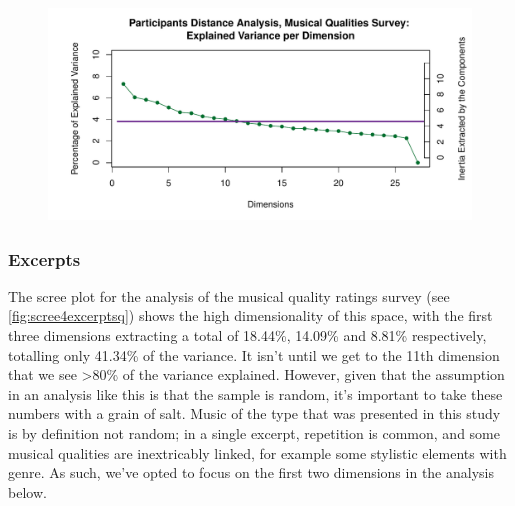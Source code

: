 \documentclass[
  english,
  man,floatsintext]{apa6}
\begin{document}
\begin{figure}

{\centering \includegraphics{Music-Descriptor-Space_files/figure-latex/screeRV-1} 

}

\caption{ }\label{fig:screeRV}
\end{figure}

\hypertarget{excerpts}{%
\subsubsection{Excerpts}\label{excerpts}}

The scree plot for the analysis of the musical quality ratings survey (see \ref{fig:scree4excerptsq}) shows the high dimensionality of this space, with the first three dimensions extracting a total of 18.44\%, 14.09\% and 8.81\% respectively, totalling only 41.34\% of the variance. It isn't until we get to the 11th dimension that we see \textgreater80\% of the variance explained. However, given that the assumption in an analysis like this is that the sample is random, it's important to take these numbers with a grain of salt. Music of the type that was presented in this study is by definition not random; in a single excerpt, repetition is common, and some musical qualities are inextricably linked, for example some stylistic elements with genre. As such, we've opted to focus on the first two dimensions in the analysis below.
\end{document}

